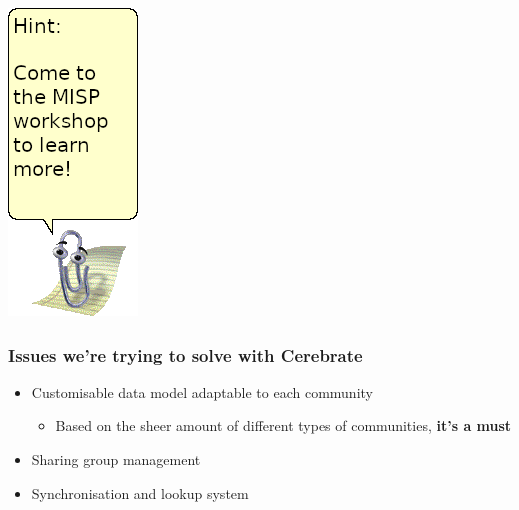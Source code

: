 \begin{frame}
\begin{minipage}{0.19\textwidth}
        \includegraphics[width=0.8\linewidth]{pictures/clippy-hint.png}
    \end{minipage}
\end{frame}

\begin{frame}
\frametitle{Issues we're trying to solve with Cerebrate}
    \begin{itemize}
        \item Customisable data model adaptable to each community
        \begin{itemize}
            \item Based on the sheer amount of different types of communities, \textbf{it's a must}
        \end{itemize}
        \item Sharing group management
        \item Synchronisation and lookup system
    \end{itemize}
\end{frame}


